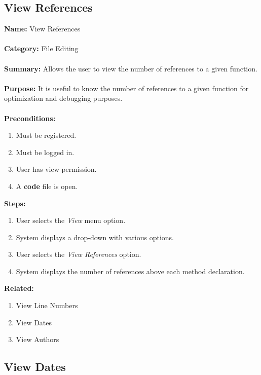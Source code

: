 \documentclass[14pt, a4paper]{article}
\begin{document}
\newpage

\subsection{View References}

\begin{framed}
	\noindent\textbf{Name:} View References \\ \\
	\textbf{Category:} File Editing \\ \\
	\textbf{Summary:} Allows the user to view the number of references to a given function. \\ \\
	\textbf{Purpose:} It is useful to know the number of references to a given function for optimization and debugging purposes. \\ \\
	\textbf{Preconditions:} 
	\begin{enumerate}
		\item Must be registered.
		\item Must be logged in.
		\item User has view permission.
		\item A \textbf{code} file is open.
	\end{enumerate}
	\textbf{Steps:}
	\begin{enumerate}
		\item User selects the \textit{View} menu option.
		\item System displays a drop-down with various options.
		\item User selects the \textit{View References} option.
		\item System displays the number of references above each method declaration.
	\end{enumerate}
	\textbf{Related:}
	\begin{enumerate}
		\item View Line Numbers
		\item View Dates
		\item View Authors
	\end{enumerate}
\end{framed}

\newpage

\subsection{View Dates}
\end{document}
